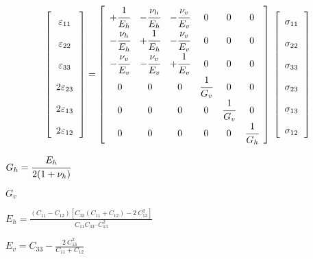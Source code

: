 \documentclass[onecolumn,11pt]{report}
\def\lthtmlcheckvsize{\ifdim\ht\sizebox<\vsize 
  \ifdim\wd\sizebox<\hsize\expandafter\hfill\fi \expandafter\vfill
  \else\expandafter\vss\fi}%
\begin{document}
{\newpage\clearpage
{}%
\begin{displaymath}%
	\left[
\begin{array} {c}
\varepsilon_{11} \cfrac{}{}\\
\varepsilon_{22} \cfrac{}{}\\
\varepsilon_{33} \cfrac{}{}\\
2 \varepsilon_{23} \cfrac{}{}\\
2 \varepsilon_{13} \cfrac{}{}\\
2 \varepsilon_{12} \cfrac{}{}
\end{array}
\right] =
\left[
\begin{array}{cccccc}
+\cfrac{1}{E_h} & -\cfrac{\nu_h}{E_h} & -\cfrac{\nu_v}{E_v} & 0 & 0 & 0\\
-\cfrac{\nu_h}{E_h} & +\cfrac{1}{E_h} & -\cfrac{\nu_v}{E_v} & 0 & 0 & 0\\
-\cfrac{\nu_v}{E_v} & -\cfrac{\nu_v}{E_v} & +\cfrac{1}{E_v} & 0 & 0 & 0\\
0 & 0 & 0 & \cfrac{1}{G_v} & 0 & 0 \\
0 & 0 & 0 & 0 & \cfrac{1}{G_v} & 0 \\
0 & 0 & 0 & 0 & 0 & \cfrac{1}{G_h}
\end{array}
\right] \:
\left[
\begin{array} {c}
\sigma_{11} \cfrac{}{}\\
\sigma_{22} \cfrac{}{}\\
\sigma_{33} \cfrac{}{}\\
\sigma_{23} \cfrac{}{}\\
\sigma_{13} \cfrac{}{}\\
\sigma_{12} \cfrac{}{}
\end{array}
\right]\end{displaymath}%
\lthtmldisplayZ
\lthtmlcheckvsize\clearpage}

{\newpage\clearpage
{}%
$ G_h = \cfrac{E_h}{2(1+\nu_h)}$%
\lthtmlindisplaymathZ
\lthtmlcheckvsize\clearpage}

{\newpage\clearpage
{}%
$ G_v$%
\lthtmlindisplaymathZ
\lthtmlcheckvsize\clearpage}

{\newpage\clearpage
{}%
$\displaystyle E_h = \frac{(C_{11}-C_{12}) \left[ C_{33}(C_{11}+C_{12})-2\: C_{13}^2 \right]}{C_{11}C_{33}–C_{13}^2} $%
\lthtmlindisplaymathZ
\lthtmlcheckvsize\clearpage}

{\newpage\clearpage
{}%
$\displaystyle E_v = C_{33} - \frac{2\:C_{13}^2}{C_{11}+C_{12}} $%
\lthtmlindisplaymathZ
\lthtmlcheckvsize\clearpage}
\end{document}
